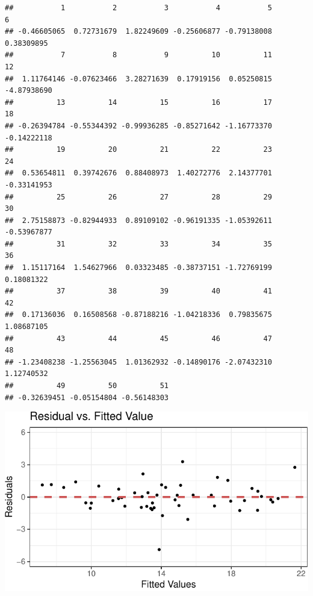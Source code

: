 \documentclass[]{article}
\newenvironment{Shaded}{\begin{snugshade}}{\end{snugshade}}
\newcommand{\DataTypeTok}[1]{\textcolor[rgb]{0.13,0.29,0.53}{#1}}
\newcommand{\DecValTok}[1]{\textcolor[rgb]{0.00,0.00,0.81}{#1}}
\newcommand{\KeywordTok}[1]{\textcolor[rgb]{0.13,0.29,0.53}{\textbf{#1}}}
\newcommand{\NormalTok}[1]{#1}
\newcommand{\OperatorTok}[1]{\textcolor[rgb]{0.81,0.36,0.00}{\textbf{#1}}}
\newcommand{\OtherTok}[1]{\textcolor[rgb]{0.56,0.35,0.01}{#1}}
\newcommand{\StringTok}[1]{\textcolor[rgb]{0.31,0.60,0.02}{#1}}
\begin{document}
\begin{verbatim}
##           1           2           3           4           5           6 
## -0.46605065  0.72731679  1.82249609 -0.25606877 -0.79138008  0.38309895 
##           7           8           9          10          11          12 
##  1.11764146 -0.07623466  3.28271639  0.17919156  0.05250815 -4.87938690 
##          13          14          15          16          17          18 
## -0.26394784 -0.55344392 -0.99936285 -0.85271642 -1.16773370 -0.14222118 
##          19          20          21          22          23          24 
##  0.53654811  0.39742676  0.88408973  1.40272776  2.14377701 -0.33141953 
##          25          26          27          28          29          30 
##  2.75158873 -0.82944933  0.89109102 -0.96191335 -1.05392611 -0.53967877 
##          31          32          33          34          35          36 
##  1.15117164  1.54627966  0.03323485 -0.38737151 -1.72769199  0.18081322 
##          37          38          39          40          41          42 
##  0.17136036  0.16508568 -0.87188216 -1.04218336  0.79835675  1.08687105 
##          43          44          45          46          47          48 
## -1.23408238 -1.25563045  1.01362932 -0.14890176 -2.07432310  1.12740532 
##          49          50          51 
## -0.32639451 -0.05154804 -0.56148303
\end{verbatim}

\begin{Shaded}
\end{Shaded}

\includegraphics{forchapter5_files/figure-latex/05-diagplot-1.pdf}
\end{document}
